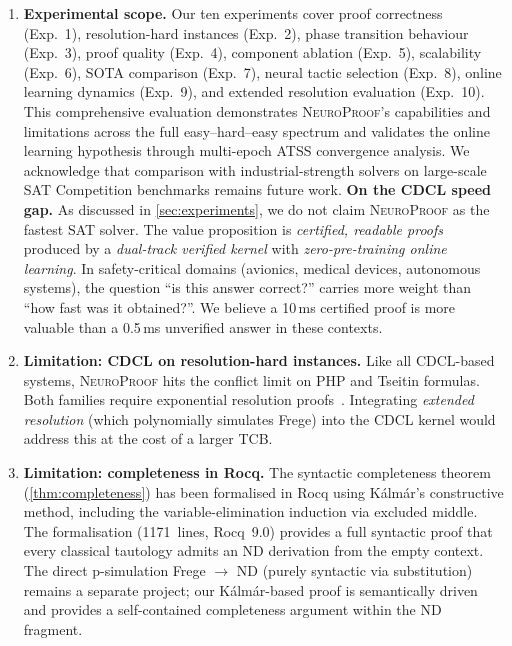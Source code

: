 \documentclass[conference]{IEEEtran}
\newcommand{\NP}{\textsc{NeuroProof}}
\begin{document}
\begin{enumerate}
  \item \textbf{Experimental scope.}  Our ten experiments cover
    proof correctness (Exp.~1), resolution-hard instances
    (Exp.~2), phase transition behaviour (Exp.~3),
    proof quality (Exp.~4), component ablation
    (Exp.~5), scalability (Exp.~6), SOTA comparison
    (Exp.~7), neural tactic selection (Exp.~8),
    online learning dynamics (Exp.~9), and extended
    resolution evaluation (Exp.~10).  This
    comprehensive evaluation demonstrates \NP{}'s capabilities and
    limitations across the full easy--hard--easy spectrum and
    validates the online learning hypothesis through multi-epoch
    ATSS convergence analysis.
    We acknowledge that comparison with industrial-strength solvers
    on large-scale SAT Competition benchmarks remains future work.
    \textbf{On the CDCL speed gap.}  As discussed in
    \cref{sec:experiments}, we do not claim \NP{} as the fastest SAT
    solver.  The value proposition is \emph{certified, readable proofs}
    produced by a \emph{dual-track verified kernel} with
    \emph{zero-pre-training online learning}.  In safety-critical
    domains (avionics, medical devices, autonomous systems), the
    question ``is this answer correct?'' carries more weight than
    ``how fast was it obtained?''.  We believe a 10\,ms certified
    proof is more valuable than a 0.5\,ms unverified answer in
    these contexts.

  \item \textbf{Limitation: CDCL on resolution-hard instances.}
    Like all CDCL-based systems, \NP{} hits the conflict limit on
    PHP and Tseitin formulas.  Both families require exponential
    resolution proofs~\cite{BenSasson2002}.  Integrating \emph{extended
    resolution} (which polynomially simulates Frege) into the CDCL
    kernel would address this at the cost of a larger TCB.

  \item \textbf{Limitation: completeness in Rocq.}
    The syntactic completeness theorem (\cref{thm:completeness}) has
    been formalised in Rocq using K\'{a}lm\'{a}r's constructive
    method, including the variable-elimination induction via excluded
    middle.  The formalisation (1171~lines, Rocq~9.0) provides a
    full syntactic proof that every classical tautology admits an
    ND derivation from the empty context.  The direct p-simulation
    Frege $\rightarrow$ ND (purely syntactic via substitution) remains
    a separate project; our K\'{a}lm\'{a}r-based proof is semantically
    driven and provides a self-contained completeness argument within
    the ND fragment.
\end{enumerate}
\end{document}
